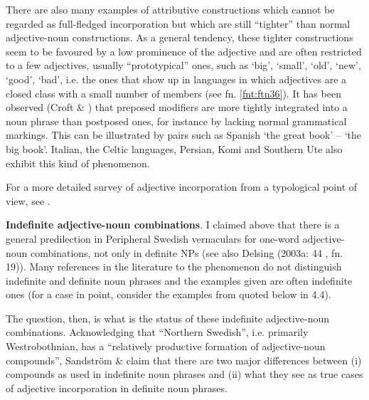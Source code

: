 There are also many examples of attributive constructions which cannot be regarded as full-fledged incorporation but which are still “tighter” than normal adjective-noun constructions. As a general tendency, these tighter constructions seem to be favoured by a low prominence of the adjective and are often restricted to a few adjectives, usually “prototypical” ones, such as ‘big’, ‘small’, ‘old’, ‘new’, ‘good’, ‘bad’, i.e. the ones that show up in languages in which adjectives are a closed class with a small number of members (see fn. \ref{fnt:ftn36}). It has been observed (Croft \& \citet{Deligianni2001}) that preposed modifiers are more tightly integrated into a noun phrase than postposed ones, for instance by lacking normal grammatical markings. This can be illustrated by pairs such as Spanish ‘the great book’ –  ‘the big book’. Italian, the Celtic languages, Persian, Komi and Southern Ute also exhibit this kind of phenomenon. 


For a more detailed survey of adjective incorporation from a typological point of view, see \citet[225-236]{Dahl2004}.


\textbf{Indefinite adjective-noun combinations}. I claimed above that there is a general predilection in Peripheral Swedish vernaculars for one-word adjective-noun combinations, not only in definite NPs (see also Delsing (2003a: 44 , fn. 19)). Many references in the literature to the phenomenon do not distinguish indefinite and definite noun phrases and the examples given are often indefinite ones (for a case in point, consider the examples from \citet{Hedblom1978} quoted below in 4.4). 


The question, then, is what is the status of these indefinite adjective-noun combinations. Acknowledging that “Northern Swedish”, i.e. primarily Westrobothnian, has a “relatively productive formation of adjective-noun compounds”, Sandström \& \citet[91]{Holmberg2003} claim that there are two major differences between (i) compounds as used in indefinite noun phrases and (ii) what they see as true cases of adjective incorporation in definite noun phrases.

